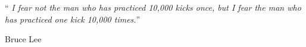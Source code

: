 \documentclass[
    12pt,
    english, %
    singlespacing, %
    oneside, %
]{MastersDoctoralThesis} %
\begin{document}



    \vspace*{0.2\textheight}

    \noindent\enquote{\itshape
    I fear not the man who has practiced 10,000 kicks once, but I fear the man who has practiced one kick 10,000 times.}\bigbreak

    \hfill Bruce Lee




\end{document}
